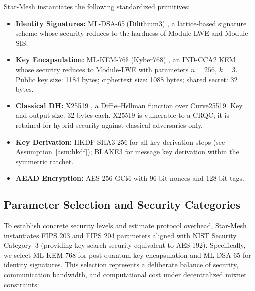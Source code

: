 \documentclass[11pt,a4paper]{article}
\theoremstyle{remark}
\theoremstyle{plain}
\begin{document}
Star-Mesh instantiates the following standardized primitives:

\begin{itemize}
  \item \textbf{Identity Signatures:} ML-DSA-65 (Dilithium3) \cite{nist_fips204}, a
        lattice-based signature scheme whose security reduces to the hardness of Module-LWE and
        Module-SIS.
  \item \textbf{Key Encapsulation:} ML-KEM-768 (Kyber768) \cite{nist_fips203}, an IND-CCA2
        KEM whose security reduces to Module-LWE with parameters $n = 256$, $k = 3$.  Public
        key size: 1184 bytes; ciphertext size: 1088 bytes; shared secret: 32 bytes.
  \item \textbf{Classical DH:} X25519 \cite{rfc7748}, a Diffie--Hellman function over
        Curve25519.  Key and output size: 32 bytes each.  X25519 is vulnerable to a CRQC; it
        is retained for hybrid security against classical adversaries only.
  \item \textbf{Key Derivation:} HKDF-SHA3-256 \cite{rfc5869} for all key derivation steps
        (see Assumption~\ref{asm:hkdf}); BLAKE3 \cite{blake3} for message key derivation within
        the symmetric ratchet.
  \item \textbf{AEAD Encryption:} AES-256-GCM \cite{nist_aesgcm} with 96-bit nonces and
        128-bit tags.
\end{itemize}

\subsection{Parameter Selection and Security Categories}
\label{sec:paramselection}

To establish concrete security levels and estimate protocol overhead, Star-Mesh instantiates FIPS 203 and FIPS 204 parameters aligned with NIST Security Category~3 (providing key-search security equivalent to AES-192). Specifically, we select ML-KEM-768 for post-quantum key encapsulation and ML-DSA-65 for identity signatures. This selection represents a deliberate balance of security, communication bandwidth, and computational cost under decentralized mixnet constraints:
\end{document}
